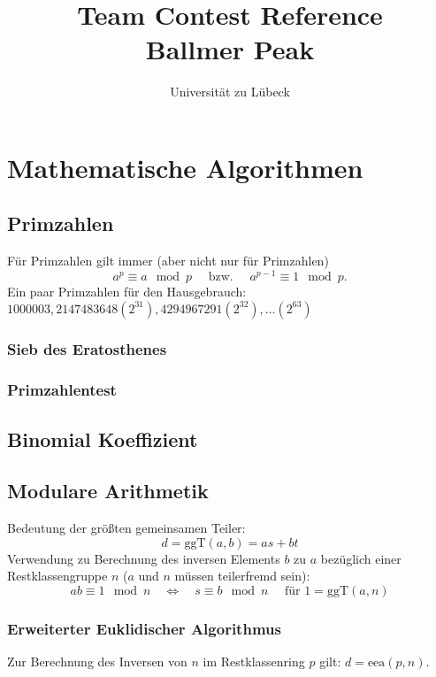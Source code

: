 \documentclass[10pt,a4paper,ngerman]{article}
\title{Team Contest Reference\\ Ballmer Peak}
\author{Universität zu Lübeck}
\begin{document}
\lstset{
    basicstyle=\ttfamily\footnotesize,
    numbers=left,
    numberstyle=\tiny,
    tabsize=2,
    numbersep=5pt,
    columns=flexible
}
\maketitle\thispagestyle{fancy}

\tableofcontents

\section{Mathematische Algorithmen}
\subsection{Primzahlen}
Für Primzahlen gilt immer (aber nicht nur für Primzahlen)
\[a^p\equiv a\mod p \quad\text{ bzw. }\quad a^{p-1}\equiv 1 \mod p.\]
Ein paar Primzahlen für den Hausgebrauch: $1000003, 2147483648 (2^{31}), 4294967291 (2^{32}), …(2^{63})$
\subsubsection{Sieb des Eratosthenes}

\subsubsection{Primzahlentest}

\subsection{Binomial Koeffizient}

\subsection{Modulare Arithmetik}
Bedeutung der größten gemeinsamen Teiler:
\[ d = \text{ggT}(a,b) = as+bt \]
Verwendung zu Berechnung des inversen Elements $b$ zu $a$ bezüglich einer Restklassengruppe $n$ ($a$ und $n$ müssen teilerfremd sein):
\[ ab\equiv 1 \mod n\quad\Leftrightarrow\quad s\equiv b \mod n\quad\text{ für }1=\text{ggT}(a,n)\]
\subsubsection{Erweiterter Euklidischer Algorithmus}

Zur Berechnung des Inversen von $n$ im Restklassenring $p$ gilt: $d = \mathrm{eea}(p,n)$.
\end{document}
